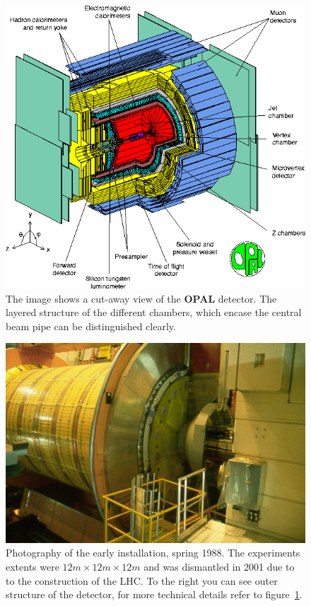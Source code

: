 \begin{figure}[htpb]
    \centering
    \includegraphics[width=1.0\linewidth]{figures/opal}
    \caption{The image shows a cut-away view of the \textbf{OPAL} detector\cite{CERN_OPAL}. The layered structure of the
    different chambers, which encase the central beam pipe can be distinguished clearly.     }
    \label{fig:opal1}
\end{figure}

\begin{figure}[htpb]
    \centering
    \includegraphics[width=1.0\linewidth]{figures/opal_photo}
    \caption{Photography of the early installation, spring 1988\cite{CERN_OPAL}. The experiments extents were
    $12m \times 12m \times 12m$ and was dismantled in 2001 due to to the construction of the LHC. To the right you can 
see outer structure of the detector, for more technical details refer to figure~\ref{fig:opal1}. }
    \label{fig:opal_photo}
\end{figure}
